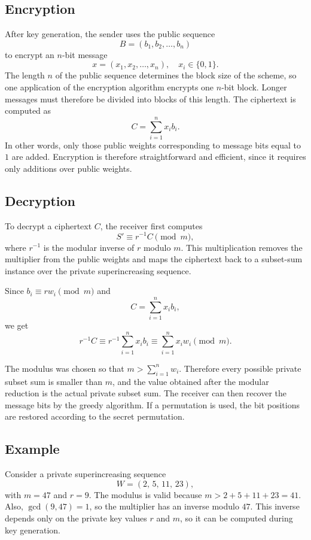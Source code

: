 \subsection{Encryption}

After key generation, the sender uses the public sequence
\[
B=(b_1,b_2,\dots,b_n)
\]
to encrypt an $n$-bit message
\[
x=(x_1,x_2,\dots,x_n), \quad x_i \in \{0,1\}.
\]
The length $n$ of the public sequence determines the block size of the scheme,
so one application of the encryption algorithm encrypts one $n$-bit block.
Longer messages must therefore be divided into blocks of this length.
The ciphertext is computed as
\[
C=\sum_{i=1}^{n} x_i b_i.
\]
In other words, only those public weights corresponding to message bits equal
to $1$ are added. Encryption is therefore straightforward and efficient, since
it requires only additions over public weights.~\cite{MerkleHellman1978}

\subsection{Decryption}

To decrypt a ciphertext $C$, the receiver first computes
\[
S' \equiv r^{-1} C \pmod m,
\]
where $r^{-1}$ is the modular inverse of $r$ modulo $m$. This multiplication
removes the multiplier from the public weights and maps the ciphertext back to
a subset-sum instance over the private superincreasing sequence.

Since $b_i \equiv r w_i \pmod m$ and
\[
    C=\sum_{i=1}^{n} x_i b_i,
\]
we get
\[
    r^{-1}C \equiv r^{-1}\sum_{i=1}^{n}x_i b_i
    \equiv \sum_{i=1}^{n}x_i w_i \pmod m.
\]

The modulus was chosen so that $m > \sum_{i=1}^{n} w_i$. Therefore every
possible private subset sum is smaller than $m$, and the value obtained after
the modular reduction is the actual private subset sum. The receiver can then
recover the message bits by the greedy algorithm. If a permutation is used, the
bit positions are restored according to the secret permutation.

\subsection*{Example}

Consider a private superincreasing sequence
\[
    W=(2,\,5,\,11,\,23),
\]
with $m=47$ and $r=9$. The modulus is valid because
$m > 2+5+11+23 = 41$. Also, $\gcd(9,47)=1$, so the multiplier has an inverse
modulo $47$. This inverse depends only on the private key values $r$ and $m$,
so it can be computed during key generation.

